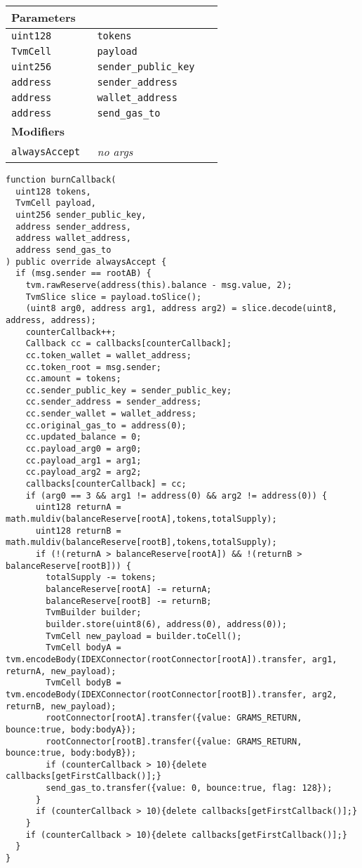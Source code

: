 \ifsoltables
\noindent\begin{tabular}{|l|l|p{5cm}|}\hline
\multicolumn{3}{|l|}{\bf Parameters}\\\hline
\tt uint128 & \tt tokens &\\\hline
\tt TvmCell & \tt payload &\\\hline
\tt uint256 & \tt sender\_{}public\_{}key &\\\hline
\tt address & \tt sender\_{}address &\\\hline
\tt address & \tt wallet\_{}address &\\\hline
\tt address & \tt send\_{}gas\_{}to &\\\hline
\multicolumn{3}{|l|}{\bf Modifiers}\\\hline
\tt alwaysAccept & {\em no args} &\\\hline
\end{tabular}
\fi

\vspace{2cm}

\begin{lstlisting}[firstnumber=522]
function burnCallback(
  uint128 tokens,
  TvmCell payload,
  uint256 sender_public_key,
  address sender_address,
  address wallet_address,
  address send_gas_to
) public override alwaysAccept {
  if (msg.sender == rootAB) {
    tvm.rawReserve(address(this).balance - msg.value, 2);
    TvmSlice slice = payload.toSlice();
    (uint8 arg0, address arg1, address arg2) = slice.decode(uint8, address, address);
    counterCallback++;
    Callback cc = callbacks[counterCallback];
    cc.token_wallet = wallet_address;
    cc.token_root = msg.sender;
    cc.amount = tokens;
    cc.sender_public_key = sender_public_key;
    cc.sender_address = sender_address;
    cc.sender_wallet = wallet_address;
    cc.original_gas_to = address(0);
    cc.updated_balance = 0;
    cc.payload_arg0 = arg0;
    cc.payload_arg1 = arg1;
    cc.payload_arg2 = arg2;
    callbacks[counterCallback] = cc;
    if (arg0 == 3 && arg1 != address(0) && arg2 != address(0)) {
      uint128 returnA = math.muldiv(balanceReserve[rootA],tokens,totalSupply);
      uint128 returnB = math.muldiv(balanceReserve[rootB],tokens,totalSupply);
      if (!(returnA > balanceReserve[rootA]) && !(returnB > balanceReserve[rootB])) {
        totalSupply -= tokens;
        balanceReserve[rootA] -= returnA;
        balanceReserve[rootB] -= returnB;
        TvmBuilder builder;
        builder.store(uint8(6), address(0), address(0));
        TvmCell new_payload = builder.toCell();
        TvmCell bodyA = tvm.encodeBody(IDEXConnector(rootConnector[rootA]).transfer, arg1, returnA, new_payload);
        TvmCell bodyB = tvm.encodeBody(IDEXConnector(rootConnector[rootB]).transfer, arg2, returnB, new_payload);
        rootConnector[rootA].transfer({value: GRAMS_RETURN, bounce:true, body:bodyA});
        rootConnector[rootB].transfer({value: GRAMS_RETURN, bounce:true, body:bodyB});
        if (counterCallback > 10){delete callbacks[getFirstCallback()];}
        send_gas_to.transfer({value: 0, bounce:true, flag: 128});
      }
      if (counterCallback > 10){delete callbacks[getFirstCallback()];}
    }
    if (counterCallback > 10){delete callbacks[getFirstCallback()];}
  }
}
\end{lstlisting}

